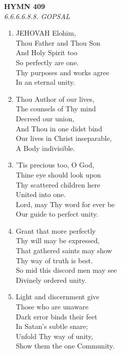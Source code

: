 \documentclass[11pt,a4paper]{article}
\begin{document}
\newpage
\begin{center}
    {\Large \textbf{HYMN 409}}
    \\
    \textit{6.6.6.6.8.8. GOPSAL}
\end{center}
\vspace{1em}

\begin{enumerate}
    \item JEHOVAH Elohim, \\
        Thou Father and Thou Son \\
        And Holy Spirit too \\
        So perfectly are one. \\
        Thy purposes and works agree \\
        In an eternal unity.

    \item Thou Author of our lives, \\
        The counsels of Thy mind \\
        Decreed our union, \\
        And Thou in one didst bind \\
        Our lives in Christ inseparable, \\
        A Body indivisible.

    \item 'Tis precious too, O God, \\
        Thine eye should look upon \\
        Thy scattered children here \\
        United into one. \\
        Lord, may Thy word for ever be \\
        Our guide to perfect unity.

    \item Grant that more perfectly \\
        Thy will may be expressed, \\
        That gathered saints may show \\
        Thy way of truth is best. \\
        So mid this discord men may see \\
        Divinely ordered unity.

    \item Light and discernment give \\
        Those who are unaware \\
        Dark error binds their feet \\
        In Satan's subtle snare; \\
        Unfold Thy way of unity, \\
        Show them the one Community.


\end{enumerate}
\end{document}

